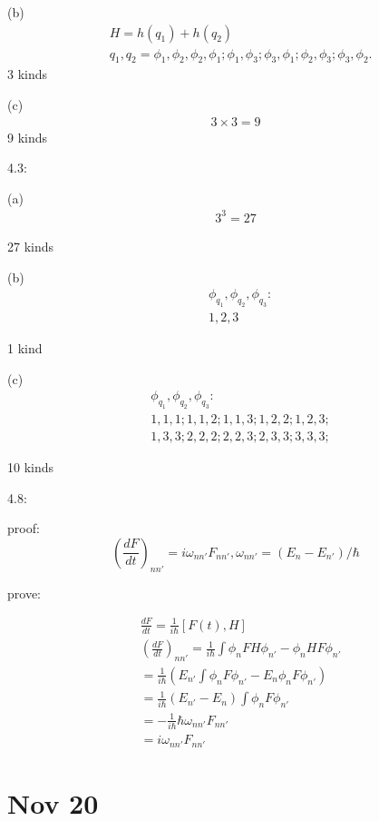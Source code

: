 \documentclass{article}
\begin{document}
(b)
\begin{align*}
&H=h(q_1)+h(q_2) \\
&q_1,q_2=\phi_1,\phi_2,\phi_2,\phi_1;\phi_1,\phi_3;\phi_3,\phi_1;\phi_2,\phi_3;\phi_3,\phi_2.
\end{align*}
3 kinds 

(c)
\begin{align*}
3\times3=9
\end{align*}
9 kinds 

4.3:

(a)
\begin{align*}
3^3=27
\end{align*}

27 kinds

(b)
\begin{align*}
  &\phi_{q_1},\phi_{q_2},\phi_{q_3}: \\
  &1,2,3
\end{align*}

1 kind

(c)
\begin{align*}
  &\phi_{q_1},\phi_{q_2},\phi_{q_3}: \\
  &1,1,1;1,1,2;1,1,3;1,2,2;1,2,3;\\
  & 1,3,3;2,2,2;2,2,3;2,3,3;3,3,3;
\end{align*}

10 kinds

4.8:

proof:
\begin{equation}
  (\frac{dF}{dt})_{nn'}=i\omega_{nn'}F_{nn'},\omega_{nn'}=(E_n-E_{n'})/\hbar
  \end{equation}

  prove:

  \begin{align*}
    &\frac{dF}{dt}=\frac1{i\hbar}[F(t),H] \\
  &(\frac{dF}{dt})_{nn'}=\frac1{i\hbar}\int \phi_nFH\phi_{n'}-\phi_nHF\phi_{n'} \\
  &=\frac1{i\hbar}(E_{n'}\int \phi_nF\phi_{n'}-E_n\phi_nF\phi_{n'}) \\
  &=\frac1{i\hbar}(E_{n'}-E_n)\int \phi_nF\phi_{n'} \\
  &=-\frac1{i\hbar}\hbar\omega_{nn'}F_{nn'} \\
  &=i\omega_{nn'}F_{nn'}
  \end{align*}

  \newpage
  \section{Nov 20}
\end{document}
